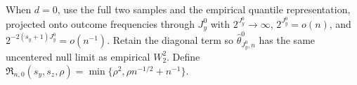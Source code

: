 When \(d=0\), use the full two samples and the empirical quantile representation, projected onto outcome frequencies through \(J_y^0\) with \(2^{J_y^0}\to\infty\), \(2^{J_y^0}=o(n)\), and \(2^{-2(s_y+1)J_y^0}=o(n^{-1})\). Retain the diagonal term so \(\widehat\theta^0_{J_y^0,n}\) has the same uncentered null limit as empirical \(W_2^2\). Define \(\mathfrak R_{n,0}(s_y,s_z,\rho)=\min\{\rho^2,\rho n^{-1/2}+n^{-1}\}\).